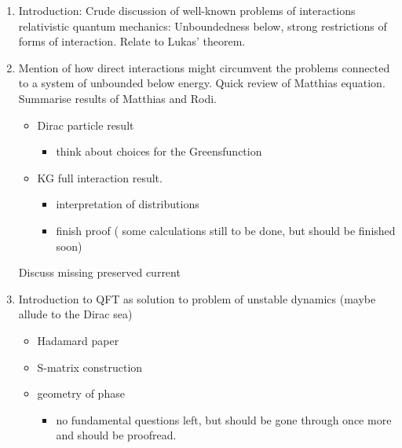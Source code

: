 \documentclass[a4paper,12pt]{article}
\begin{document}
\begin{enumerate}
\item Introduction: Crude discussion of well-known problems of interactions relativistic quantum mechanics: Unboundedness below, strong restrictions of forms of interaction. Relate to Lukas' theorem.

\item Mention of how direct interactions might circumvent the problems connected to a system of unbounded below energy.
 Quick review of Matthias equation. Summarise results of Matthias and Rodi. 
 \begin{itemize}
 \item Dirac particle result
 \begin{itemize}
 \item think about choices for the Greensfunction
 \end{itemize}
 
 \item KG full interaction result.
 \begin{itemize}
 \item interpretation of distributions
 \item finish proof ( some calculations still to be done, but should be finished soon)
 \end{itemize}
 
 \end{itemize}
 Discuss missing preserved current

\item Introduction to QFT as solution to problem of unstable dynamics (maybe allude to the Dirac sea)
\begin{itemize}
\item Hadamard paper
\item S-matrix construction
\item geometry of phase
\begin{itemize}
\item no fundamental questions left, but should be gone through once more and should be proofread.
\end{itemize}
\end{itemize}
\end{enumerate}
\end{document}
